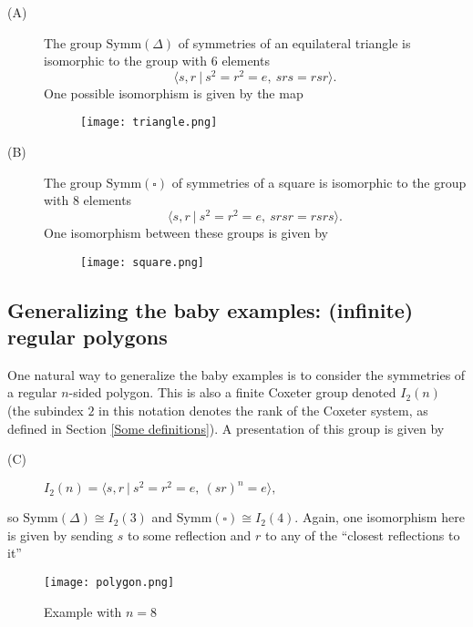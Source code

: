 \documentclass[12pt]{wart}
\theoremstyle{remark}
\begin{document}
\begin{description}

\item[(A)] The group $\mathrm{Symm}(\Delta)$ of symmetries of an equilateral triangle  is isomorphic to the group with $6$ elements
$$ \langle s, r\ \vert \ s^2=r^2=e, \ srs=rsr\rangle.$$
One possible isomorphism is given by the map

\begin{figure}[H] 
\begin{center}
 \texttt{[image: triangle.png]} 
\end{center}
\end{figure} 

  

\item[(B)] The group $\mathrm{Symm}(\square)$ of {symmetries of a square}  is isomorphic to the group with $8$ elements
$$ \langle s, r\ \vert \ s^2=r^2=e, \ srsr=rsrs\rangle.$$
One isomorphism between these groups is given by 
\begin{figure}[H] 
\begin{center}
 \texttt{[image: square.png]} 
\end{center}
\end{figure} 

\end{description} 


\subsection{Generalizing the baby examples: (infinite) regular polygons}

 One natural way to generalize the  baby examples is to consider the symmetries of a regular $n$-sided polygon. This is also a finite Coxeter group denoted $I_2(n)$ (the subindex $2$ in this notation denotes the rank of the Coxeter system, as defined in Section \ref{Some definitions}). A presentation of this group is given by
\begin{description}
\item[(C)]  \hspace{3cm} $ I_2(n)= \langle s, r\ \vert \ s^2=r^2=e, \ (sr)^{n}=e\rangle,$
\end{description} 
so $\mathrm{Symm}(\Delta)\cong I_2(3)$ and $\mathrm{Symm}(\square)\cong I_2(4).$ Again, one isomorphism here is given by sending $s$ to some reflection and $r$ to any of the ``closest reflections to it'' 
\begin{figure}[H] 
\begin{center}
 \texttt{[image: polygon.png]} 
\caption{Example with $n=8$}  
\end{center}
\end{figure} 
\end{document}
